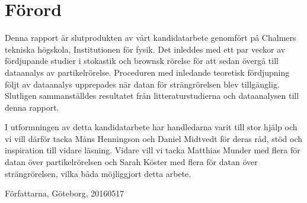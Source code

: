 \chapter*{Förord}

Denna rapport är slutprodukten av vårt kandidatarbete genomfört på Chalmers tekniska högskola, Institutionen för fysik. Det inleddes med ett par veckor av fördjupande studier i stokastik och brownsk rörelse för att sedan övergå till dataanalys av partikelrörelse. Proceduren med inledande teoretisk fördjupning följt av dataanalys upprepades när datan för strängrörelsen blev tillgänglig. Slutligen sammanställdes resultatet från litteraturstudierna och dataanalysen till denna rapport.

I utformningen av detta kandidatarbete har handledarna varit till stor hjälp och vi vill därför tacka Måns Henningson och Daniel Midtvedt för deras råd, stöd och inspiration till vidare läsning. Vidare vill vi tacka Matthias Munder med flera för datan över partikelrörelsen och Sarah Köster med flera för datan över strängrörelsen, vilka båda möjliggjort detta arbete.

\vspace{.5cm}

\begin{flushright}
Författarna, Göteborg, 2016\hspace{1pt}\raisebox{1pt}{-}\hspace{1pt}05\hspace{1pt}\raisebox{1pt}{-}17
\end{flushright}

